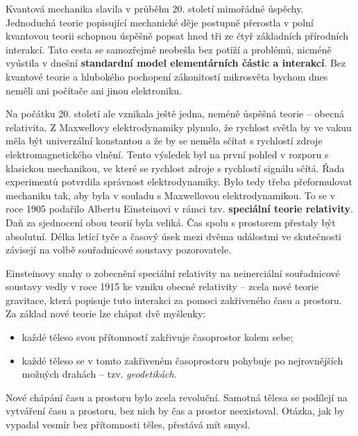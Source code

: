     Kvantová mechanika slavila v průběhu 20. století mimořádné úspěchy. Jednoduchá teorie popisující
    mechanické děje postupně přerostla v polní kvantovou teorii schopnou úspěšně popsat hned tři ze
    čtyř základních přírodních interakcí. Tato cesta se samozřejmě neobešla bez potíží a problémů,
    nicméně vyústila v dnešní \textbf{standardní model elementárních částic a interakcí}. Bez
    kvantové teorie a hlubokého pochopení zákonitostí mikrosvěta bychom dnes neměli ani počítače ani
    jinou elektroniku. 

    Na počátku 20. století ale vznikala ještě jedna, neméně úspěšná teorie – obecná relativita. Z
    Maxwellovy elektrodynamiky plynulo, že rychlost světla by ve vakuu měla být univerzální
    konstantou a že by se neměla sčítat s rychlostí zdroje elektromagnetického vlnění. Tento
    výsledek byl na první pohled v rozporu s klasickou mechanikou, ve které se rychlost zdroje s
    rychlostí signálu sčítá. Řada experimentů potvrdila správnost elektrodynamiky. Bylo tedy třeba
    přeformulovat mechaniku tak, aby byla v souladu s Maxwellovou elektrodynamikou. To se v roce
    1905 podařilo Albertu Einsteinovi v rámci tzv. \textbf{speciální teorie relativity}. Daň za
    sjednocení obou teorií byla veliká. Čas spolu s prostorem přestaly být absolutní. Délka letící
    tyče a časový úsek mezi dvěma událostmi ve skutečnosti závisejí na volbě souřadnicové soustavy
    pozorovatele.
    
    Einsteinovy snahy o zobecnění speciální relativity na neinerciální souřadnicové soustavy vedly v
    roce 1915 ke vzniku obecné relativity – zcela nové teorie gravitace, která popisuje tuto
    interakci za pomoci zakřiveného času a prostoru. Za základ nové teorie lze chápat dvě myšlenky:
    \begin{itemize}[noitemsep]
      \item každé těleso svou přítomností zakřivuje časoprostor kolem sebe;
      \item každé těleso se v tomto zakřiveném časoprostoru pohybuje po nejrovnějších možných
            drahách – tzv. \emph{geodetikách}.
    \end{itemize}

    Nové chápání času a prostoru bylo zcela revoluční. Samotná tělesa se podílejí na vytváření času
    a prostoru, bez nich by čas a prostor neexistoval. Otázka, jak by vypadal vesmír bez přítomnosti
    těles, přestává mít smysl.
    
